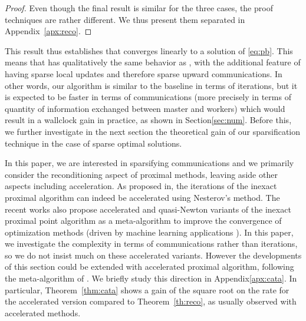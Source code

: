 \begin{proof}
Even though the final result is similar for the three cases, the proof techniques are rather different. We thus present them separated in Appendix~\ref{apx:reco}.
\end{proof}

This result thus establishes that \recoalgo converges linearly to a solution of \eqref{eq:pb}. This means that \recoalgo has qualitatively the same behavior as \dave, with the additional feature of having sparse local updates and therefore sparse upward communications. In other words, our algorithm is similar to the baseline in terms of iterations, but it is expected to be faster in terms of communications (more precisely in terms of quantity of information exchanged between master and workers) which would result in a wallclock gain in practice, as shown in Section\;\ref{sec:num}. Before this, we further investigate in the next section the theoretical gain of our sparsification technique in the case of sparse optimal solutions.


\begin{remark}\label{rem:cata}
In this paper, we are interested in sparsifying communications and we primarily consider the reconditioning aspect of proximal methods, leaving aside other aspects including acceleration. As proposed in\;\cite{guler1992new}, the iterations of the inexact proximal algorithm can indeed be accelerated using Nesterov's method\;\cite{nesterov1983method}.
The recent works\;\cite{lin2017catalyst,lin2019inexact} also propose accelerated and quasi-Newton variants of the inexact proximal point algorithm as a meta-algorithm to improve the convergence of optimization methods (driven by machine learning applications \cite{lin2015universal}). 
In this paper, we investigate the complexity in terms of communications rather than iterations, so we do not insist much on these accelerated variants. However the developments of this section could be extended with accelerated proximal algorithm, following the meta-algorithm of \cite{lin2017catalyst}. We briefly study this direction in Appendix\;\ref{apx:cata}.  
In particular, Theorem~\ref{thm:cata} shows a gain of the square root on the rate for the accelerated version compared to Theorem~\ref{th:reco}, as usually observed with accelerated methods. 
\end{remark}
